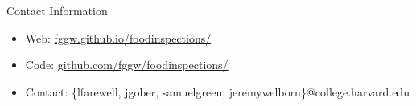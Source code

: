 \documentclass[final]{beamer}
\newlength{\onecolwid}
\begin{document}
\begin{frame}[t]
\begin{columns}[t]
\begin{column}{\onecolwid}
\begin{alertblock}{Contact Information}
\begin{itemize}
\item Web: \href{https://fggw.github.io/foodinspections/}{fggw.github.io/foodinspections/}
\item Code: \href{http://github.com/fggw/foodinspections}{github.com/fggw/foodinspections/}
\item Contact: \{lfarewell, jgober, samuelgreen, jeremywelborn\}@college.harvard.edu
\end{itemize}

\end{alertblock}




\end{column} %

\end{columns} %

\end{frame} %
\end{document}
